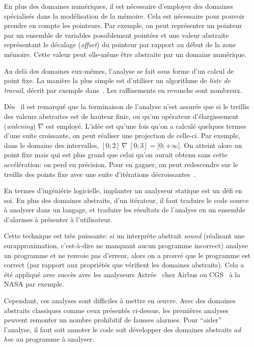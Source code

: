 En plus des domaines numériques, il est nécessaire d'employer des domaines
spécialisés dans la modélisation de la mémoire. Cela est nécessaire pour pouvoir
prendre en compte les pointeurs. Par exemple, on peut représenter un pointeur
par un ensemble de variables possiblement pointées et une valeur abstraite
représentant le décalage (\emph{offset}) du pointeur par rapport au début de la
zone mémoire. Cette valeur peut elle-même être abstraite par un domaine
numérique.

Au delà des domaines eux-mêmes, l'analyse se fait sous forme d'un calcul de
point fixe. La manière la plus simple est d'utiliser un algorithme de
\emph{liste de travail}, décrit par exemple dans~\cite{tapsoft95}. Les
raffinements en revanche sont nombreux.

Dès~\cite{Cousot77} il est remarqué que la terminaison de l'analyse n'est
assurée que si le treillis des valeurs abstraites est de hauteur finie, ou qu'un
opérateur d'élargissement (\emph{widening}) $\nabla$ est employé. L'idée est
qu'une fois qu'on a calculé quelques termes d'une suite croissante, on peut
réaliser une projection de celle-ci. Par exemple, dans le domaine des
intervalles, $[0;2]~\nabla~[0;3] = [0;+\infty[$. On atteint alors un point fixe
mais qui est plus grand que celui qu'on aurait obtenu sans cette accélération:
on perd en précision. Pour en gagner, on peut redescendre sur le treillis des
points fixe avec une suite d'itérations décroissantes~\cite{granger,policy}.

En termes d'ingéniérie logicielle, implanter un analyseur statique est un défi
en soi. En plus des domaines abstraits, d'un itérateur, il faut traduire le code
source à analyser dans un langage, et traduire les résultats de l'analyse en un
ensemble d'alarmes à présenter à l'utilisateur.

Cette technique est très puissante: si un interprète abstrait \emph{sound}
(réalisant une surapproximation, c'est-à-dire ne manquant aucun programme
incorrect) analyse un programme et ne renvoie pas d'erreur, alors on a prouvé
que le programme est correct (par rapport aux propriétés que vérifient les
domaines abstraits). Cela a été appliqué avec succès avec les analyseurs
Astrée~\cite{Astree04,Astree05,AstreeScale} chez Airbus ou CGS~\cite{cgs} à la
NASA par exemple.

Cependant, ces analyses sont difficiles à mettre en œuvre. Avec des domaines
abstraits classiques comme ceux présentés ci-dessus, les premières analyses
peuvent remonter un nombre prohibitif de fausses alarmes. Pour \enquote{aider}
l'analyse, il faut soit annoter le code soit développer des domaines abstraits
\emph{ad hoc} au programme à analyser.

